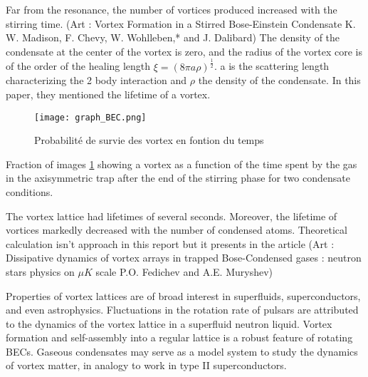 \documentclass[a4paper]{article}
\begin{document}
\begin{multicols}{2}
Far from the resonance, the number of vortices produced increased with the stirring time. (Art : Vortex Formation in a Stirred Bose-Einstein Condensate K. W. Madison, F. Chevy, W. Wohlleben,* and J. Dalibard) The density of the condensate at the center of the vortex is zero, and the radius of the vortex core is of the order of the healing length $\xi = (8\pi a\rho)^{\frac{1}{2}}$.
 a is the scattering length characterizing the 2 body interaction and $\rho$ the density of the condensate. In this paper, they mentioned the lifetime of a vortex.


\begin{figure}[H]
 \centering
 \texttt{[image: graph\_BEC.png]}
 \caption{\label{fig3:graph_BEC}Probabilité de survie des vortex en fontion du temps}
\end{figure}

Fraction of images \ref{fig3:graph_BEC} showing a vortex as a function of the time spent by the gas in the axisymmetric trap after the end of the stirring phase for two condensate conditions.

 The vortex lattice had lifetimes of several seconds. Moreover, the lifetime of vortices markedly decreased with the number of condensed atoms. Theoretical calculation isn’t approach in this report but it presents in the article (Art : Dissipative dynamics of vortex arrays in trapped Bose-Condensed gases : neutron stars physics on $\mu K$ scale P.O. Fedichev and A.E. Muryshev)

Properties of vortex lattices are of broad interest in superfluids, superconductors, and even astrophysics. Fluctuations in the rotation rate of pulsars are attributed to the dynamics of the vortex lattice in a superfluid neutron liquid. Vortex formation and self-assembly into a regular lattice is a robust feature of rotating BECs. Gaseous condensates may serve as a model system to study the dynamics of vortex matter, in analogy to work in type II superconductors.




\end{multicols}
\end{document}
